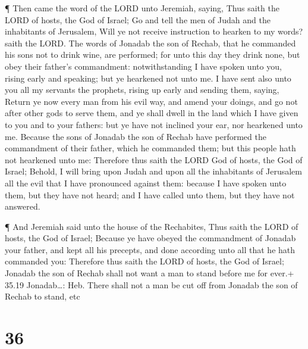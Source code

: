  ¶ Then came the word of the LORD unto Jeremiah, saying,
 Thus saith the LORD of hosts, the God of Israel; Go and
tell the men of Judah and the inhabitants of Jerusalem, Will ye not
receive instruction to hearken to my words? saith the LORD.
 The words of Jonadab the son of Rechab, that he commanded
his sons not to drink wine, are performed; for unto this day they drink
none, but obey their father's commandment: notwithstanding I have spoken
unto you, rising early and speaking; but ye hearkened not unto me.
 I have sent also unto you all my servants the prophets,
rising up early and sending them, saying, Return ye now every man from
his evil way, and amend your doings, and go not after other gods to
serve them, and ye shall dwell in the land which I have given to you and
to your fathers: but ye have not inclined your ear, nor hearkened unto
me.  Because the sons of Jonadab the son of Rechab have
performed the commandment of their father, which he commanded them; but
this people hath not hearkened unto me:  Therefore thus
saith the LORD God of hosts, the God of Israel; Behold, I will bring
upon Judah and upon all the inhabitants of Jerusalem all the evil that I
have pronounced against them: because I have spoken unto them, but they
have not heard; and I have called unto them, but they have not answered.

 ¶ And Jeremiah said unto the house of the Rechabites, Thus
saith the LORD of hosts, the God of Israel; Because ye have obeyed the
commandment of Jonadab your father, and kept all his precepts, and done
according unto all that he hath commanded you:  Therefore
thus saith the LORD of hosts, the God of Israel; Jonadab the son of
Rechab shall not want a man to stand before me for ever.+ 35.19
Jonadab\ldots: Heb. There shall not a man be cut off from Jonadab the
son of Rechab to stand, etc

\hypertarget{section-35}{%
\section{36}\label{section-35}}

